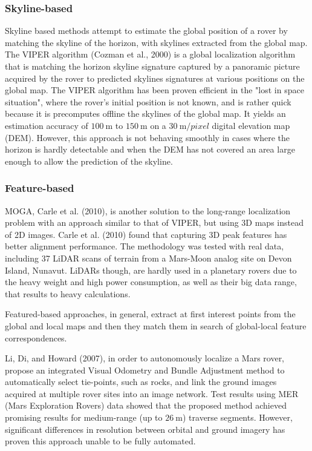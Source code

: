 \subsubsection{Skyline-based}

Skyline based methods attempt to estimate the global position of a rover
by matching the skyline of the horizon, with skylines extracted from
the global map.
The VIPER algorithm (Cozman et al., 2000) is a global localization
algorithm that is matching the horizon skyline signature captured by a
panoramic picture acquired by the rover to predicted skylines signatures
at various positions on the global map.
The VIPER algorithm has been proven efficient in the "lost in space situation",
where the rover's initial position is not known, and is rather quick because
it is precomputes offline the skylines of the global map.
It yields an estimation accuracy of $\SI{100}{\m}$ to $\SI{150}{\m}$ on a
$\SI{30}{\m \per pixel}$ digital elevation map (DEM).
However, this approach is not behaving smoothly in cases where the horizon
is hardly detectable and when the DEM has not covered an area large enough
to allow the prediction of the skyline.

\subsubsection{Feature-based}

MOGA, Carle et al. (2010), is another solution to the long-range localization
problem with an approach similar to that of VIPER, but using 3D maps
instead of 2D images.
Carle et al. (2010) found that capturing 3D peak features has better
alignment performance.
The methodology was tested with real data, including 37 LiDAR scans of
terrain from a Mars-Moon analog site on Devon Island, Nunavut.
LiDARs though, are hardly used in a planetary rovers due to the heavy
weight and high power consumption, as well as their big data range,
that results to heavy calculations.

Featured-based approaches, in general, extract at first interest points
from the global and local maps and then they match them in search of
global-local feature correspondences.

Li, Di, and Howard (2007), in order to autonomously localize a Mars rover,
propose an integrated Visual Odometry and Bundle Adjustment method to
automatically select tie-points, such as rocks, and link the ground images
acquired at multiple rover sites into an image network.
Test results using MER (Mars Exploration Rovers) data showed that the
proposed method achieved promising results for medium-range (up to
$\SI{26}{\m}$) traverse segments.
However, significant differences in resolution between orbital and
ground imagery has proven this approach unable to be fully automated.

